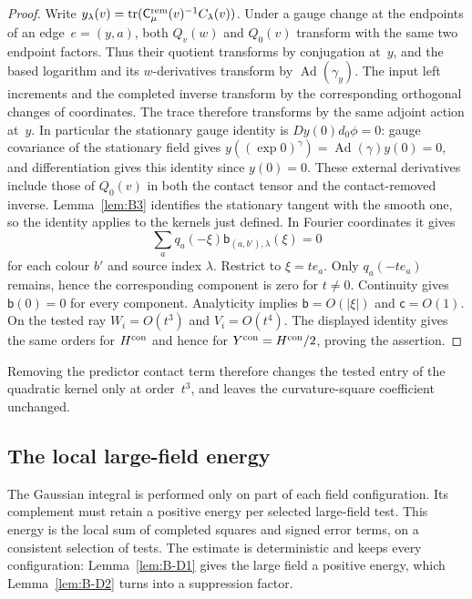 \begin{proof}
Write $y_\lambda(v)=\operatorname{tr}(\mathsf C^{\rm rem}_\mu(v)^{-1}C_\lambda(v))$. Under a gauge change at the endpoints of an edge~$e=(y,a)$, both $Q_v(w)$ and $Q_0(v)$ transform with the same two endpoint factors. Thus their quotient transforms by conjugation at~$y$, and the based logarithm and its $w$-derivatives transform by $\operatorname{Ad}(\gamma_y)$. The input left increments and the completed inverse transform by the corresponding orthogonal changes of coordinates. The trace therefore transforms by the same adjoint action at~$y$. In particular the stationary gauge identity is $Dy(0)d_0\phi=0$: gauge covariance of the stationary field gives $y((\exp0)^\gamma)=\operatorname{Ad}(\gamma)y(0)=0$, and differentiation gives this identity since $y(0)=0$. These external derivatives include those of $Q_0(v)$ in both the contact tensor and the contact-removed inverse. Lemma~\ref{lem:B3} identifies the stationary tangent with the smooth one, so the identity applies to the kernels just defined. In Fourier coordinates it gives
\begin{equation*}
\sum_a q_a(-\xi)\mathsf b_{(a,b'),\lambda}(\xi)=0
\end{equation*}
for each colour $b'$ and source index $\lambda$. Restrict to $\xi=te_a$. Only $q_a(-te_a)$ remains, hence the corresponding component is zero for $t\ne0$. Continuity gives $\mathsf b(0)=0$ for every component. Analyticity implies $\mathsf b=O(|\xi|)$ and $\mathsf c=O(1)$. On the tested ray $W_i=O(t^3)$ and $V_i=O(t^4)$. The displayed identity gives the same orders for $H^{\rm con}$ and hence for $Y^{\rm con}=H^{\rm con}/2$, proving the assertion.
\end{proof}
Removing the predictor contact term therefore changes the tested entry of the quadratic kernel only at order~$t^3$, and leaves the curvature-square coefficient unchanged.

\subsection{The local large-field energy}\label{subsec:B-energy}

The Gaussian integral is performed only on part of each field configuration. Its complement must retain a positive energy per selected large-field test. This energy is the local sum of completed squares and signed error terms, on a consistent selection of tests. The estimate is deterministic and keeps every configuration: Lemma~\ref{lem:B-D1} gives the large field a positive energy, which Lemma~\ref{lem:B-D2} turns into a suppression factor.

